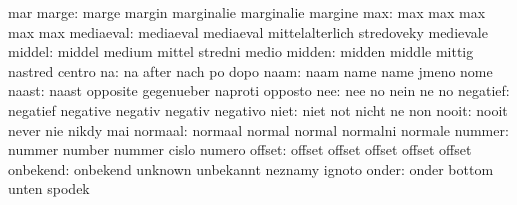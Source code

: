                            mar                       %
                    marge: marge                     margin
                           marginalie                marginalie
                           margine
                      max: max                       max
                           max                       max
                           max
                mediaeval: mediaeval                 mediaeval
                           mittelalterlich           stredoveky
                           medievale
                   middel: middel                    medium
                           mittel                    stredni
                           medio
                   midden: midden                    middle
                           mittig                    nastred
                           centro
                       na: na                        after
                           nach                      po
                           dopo
                     naam: naam                      name
                           name                      jmeno
                           nome
                    naast: naast                     opposite
                           gegenueber                naproti
                           opposto
                      nee: nee                       no
                           nein                      ne
                           no
                 negatief: negatief                  negative
                           negativ                   negativ
                           negativo
                     niet: niet                      not
                           nicht                     ne
                           non
                    nooit: nooit                     never
                           nie                       nikdy
                           mai
                  normaal: normaal                   normal
                           normal                    normalni
                           normale
                   nummer: nummer                    number
                           nummer                    cislo
                           numero
                   offset: offset                    offset
                           offset                    offset
                           offset
                 onbekend: onbekend                  unknown
                           unbekannt                 neznamy
                           ignoto
                    onder: onder                     bottom
                           unten                     spodek

